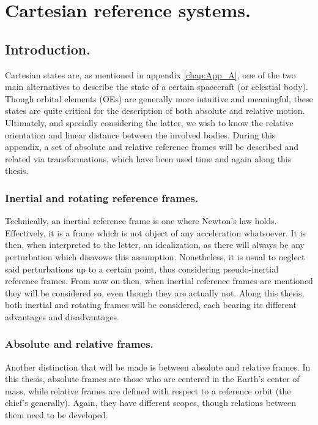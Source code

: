 \chapter{Cartesian reference systems.}
%
\label{chap: App_B}
%
\section{Introduction.}
%
\indent Cartesian states are, as mentioned in appendix \ref{chap:App_A}, one of the two main alternatives to describe the state of a certain spacecraft (or celestial body). Though orbital elements (OEs) are generally more intuitive and meaningful, these states are quite critical for the description of both absolute and relative motion. Ultimately, and specially considering the latter, we wish to know the relative orientation and linear distance between the involved bodies. During this appendix, a set of absolute and relative reference frames will be described and related via transformations, which have been used time and again along this thesis.
%
	\subsection{Inertial and rotating reference frames.}
	\indent Technically, an inertial reference frame is one where Newton's law holds. Effectively, it is a frame which is not object of any acceleration whatsoever. It is then, when interpreted to the letter, an idealization, as there will always be any perturbation which disavows this assumption. Nonetheless, it is usual to neglect said perturbations up to a certain point, thus considering pseudo-inertial reference frames. From now on then, when inertial reference frames are mentioned they will be considered so, even though they are actually not. Along this thesis, both inertial and rotating frames will be considered, each bearing its different advantages and disadvantages.
	\subsection{Absolute and relative frames.}
	\indent Another distinction that will be made is between absolute and relative frames. In this thesis, absolute frames are those who are centered in the Earth's center of mass, while relative frames are defined with respect to a reference orbit (the chief's generally). Again, they have different scopes, though relations between them need to be developed.
